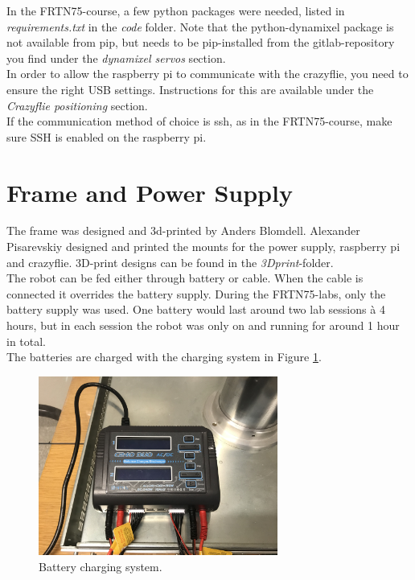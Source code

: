\documentclass[10pt,a4paper]{article}
\begin{document}
	In the FRTN75-course, a few python packages were needed, listed in \textit{requirements.txt} in the \textit{code} folder. Note that the python-dynamixel package is not available from pip, but needs to be pip-installed from the gitlab-repository you find under the \textit{dynamixel servos} section.
	\\
	
	In order to allow the raspberry pi to communicate with the crazyflie, you need to ensure the right USB settings. Instructions for this are available under the \textit{Crazyflie positioning} section.
	\\
	
	If the communication method of choice is ssh, as in the FRTN75-course, make sure SSH is enabled on the raspberry pi.
	
	
	\section{Frame and Power Supply}
	
	The frame was designed and 3d-printed by Anders Blomdell. Alexander Pisarevskiy designed and printed the mounts for the power supply, raspberry pi and crazyflie. 3D-print designs can be found in the \textit{3Dprint}-folder.
	\\
	
	The robot can be fed either through battery or cable. When the cable is connected it overrides the battery supply. During the FRTN75-labs, only the battery supply was used. One battery would last around two lab sessions à 4 hours, but in each session the robot was only on and running for around 1 hour in total.
	\\
	
	The batteries are charged with the charging system in Figure \ref{fig:charger}.
	
	\begin{figure}[h]
		\centering
		\includegraphics[width=0.7\textwidth]{figs/charger}
		\caption{Battery charging system.}
		\label{fig:charger}
	\end{figure}
\end{document}
